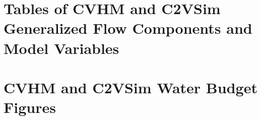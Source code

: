 \section{Tables of CVHM and C2VSim Generalized Flow Components and Model Variables}





\newpage

\section{CVHM and C2VSim Water Budget Figures} \label{app:compare_figs}

\newcommand{\GWBudgetText}{C2VSim and CVHM estimated cumulative annual change in groundwater storage, along with linear groundwater storage trends and annual change in storage volumes during 1962-2003 for }

\newcommand{\GWCombinedTextOne}{Annual groundwater budget components from C2VSim and CVHM for }
\newcommand{\GWCombinedTextTwo}{ Flows into the groundwater system include landscape recharge, surface water gains, and net flows in from boundaries and adjacent subregions. Flows out include groundwater pumping, losses to surface water, and net flows out from boundaries and adjacent subregions}

\newcommand{\GWMultiTextOne}{Comparison of similar annual groundwater budget components from C2VSim and CVHM for }
\newcommand{\GWMultiTextTwo}{ including similar flow components and total flows into (A) and out of (B) the groundwater system, along with statistical measures of the correspondence between similar flow components for each model (C), including normalized root mean square error (NRMSE) and correlation (Pearson's $r$).}

\newcommand{\HydPropOne}{Box plots of hydraulic properties of model layers in CVHM and C2VSim for }
\newcommand{\HydPropTwo}{ including horizontal and vertical hydraulic conductivity ($K$) and storage properties, which are represented by specific storage ($Ss$) for all layers in CVHM, and by specific yield for layer 1 and Ss in layers 3-4 in C2VSim*. The Corcoran Clay is represented by layers 4-5 and 2 in CVHM and C2VSim, respectively, and is only represented for some subregions, where it is present. C2VSim does not simulate horizontal K and storage properties for the Corcoran Clay. In general, CVHM layers 1-3, 4-5, 6-8, and 9-10 correspond with C2VSim layers 1, 2, 3, and 4, respectively.}

